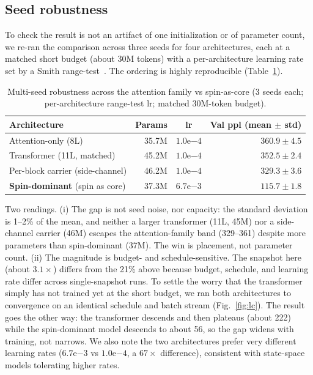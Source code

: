 \documentclass[journal]{IEEEtran}
\begin{document}
\subsection{Seed robustness}
To check the result is not an artifact of one initialization or of parameter count, we re-ran the comparison across three seeds for four architectures, each at a matched short budget (about 30M tokens) with a per-architecture learning rate set by a Smith range-test~\cite{smith2017}. The ordering is highly reproducible (Table~\ref{tab:seeds}).

\begin{table}[t]\centering\small
\caption{Multi-seed robustness across the attention family vs spin-as-core (3 seeds each; per-architecture range-test lr; matched 30M-token budget).}
\label{tab:seeds}
\begin{tabular}{@{}l r c r@{}}
\toprule
Architecture & Params & lr & Val ppl (mean $\pm$ std) \\
\midrule
Attention-only (8L) & 35.7M & $1.0\mathrm{e}{-4}$ & $360.9 \pm 4.5$ \\
Transformer (11L, matched) & 45.2M & $1.0\mathrm{e}{-4}$ & $352.5 \pm 2.4$ \\
Per-block carrier (side-channel) & 46.2M & $1.0\mathrm{e}{-4}$ & $329.3 \pm 3.6$ \\
\textbf{Spin-dominant} (spin as core) & 37.3M & $6.7\mathrm{e}{-3}$ & $\mathbf{115.7 \pm 1.8}$ \\
\bottomrule
\end{tabular}
\end{table}

Two readings. (i) The gap is not seed noise, nor capacity: the standard deviation is 1--2\% of the mean, and neither a larger transformer (11L, 45M) nor a side-channel carrier (46M) escapes the attention-family band (329--361) despite more parameters than spin-dominant (37M). The win is placement, not parameter count. (ii) The magnitude is budget- and schedule-sensitive. The snapshot here (about $3.1\times$) differs from the 21\% above because budget, schedule, and learning rate differ across single-snapshot runs. To settle the worry that the transformer simply has not trained yet at the short budget, we ran both architectures to convergence on an identical schedule and batch stream (Fig.~\ref{fig:lc}). The result goes the other way: the transformer descends and then plateaus (about 222) while the spin-dominant model descends to about 56, so the gap widens with training, not narrows. We also note the two architectures prefer very different learning rates ($6.7\mathrm{e}{-3}$ vs $1.0\mathrm{e}{-4}$, a $67\times$ difference), consistent with state-space models tolerating higher rates.
\end{document}
